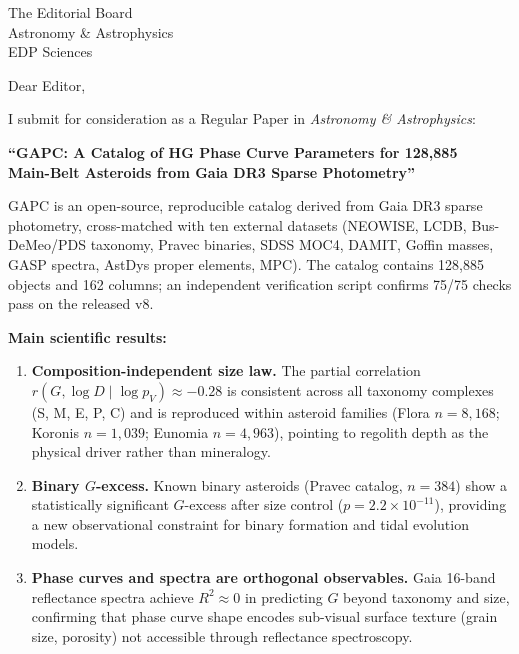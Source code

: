 \documentclass[12pt,a4paper]{letter}
\date{\today}
\begin{document}
\begin{letter}{The Editorial Board \\
               Astronomy \& Astrophysics \\
               EDP Sciences}

\opening{Dear Editor,}

I submit for consideration as a Regular Paper in \textit{Astronomy \&
Astrophysics}:

\medskip
\begin{center}
\textbf{``GAPC: A Catalog of HG Phase Curve Parameters for 128,885\\
Main-Belt Asteroids from Gaia DR3 Sparse Photometry''}
\end{center}
\medskip

GAPC is an open-source, reproducible catalog derived from Gaia DR3
sparse photometry, cross-matched with ten external datasets (NEOWISE,
LCDB, Bus-DeMeo/PDS taxonomy, Pravec binaries, SDSS MOC4, DAMIT,
Goffin masses, GASP spectra, AstDys proper elements, MPC). The catalog
contains 128,885 objects and 162 columns; an independent verification
script confirms 75/75 checks pass on the released v8.

\medskip
\textbf{Main scientific results:}

\begin{enumerate}

\item \textbf{Composition-independent size law.} The partial correlation
$r(G,\log D \mid \log p_V) \approx -0.28$ is consistent across all
taxonomy complexes (S, M, E, P, C) and is reproduced within asteroid
families (Flora $n=8{,}168$; Koronis $n=1{,}039$; Eunomia $n=4{,}963$),
pointing to regolith depth as the physical driver rather than
mineralogy.

\item \textbf{Binary $G$-excess.} Known binary asteroids (Pravec
catalog, $n=384$) show a statistically significant $G$-excess after size
control ($p = 2.2 \times 10^{-11}$), providing a new observational
constraint for binary formation and tidal evolution models.

\item \textbf{Phase curves and spectra are orthogonal observables.}
Gaia 16-band reflectance spectra achieve $R^2 \approx 0$ in predicting
$G$ beyond taxonomy and size, confirming that phase curve shape encodes
sub-visual surface texture (grain size, porosity) not accessible through
reflectance spectroscopy.

\end{enumerate}


\end{letter}
\end{document}
